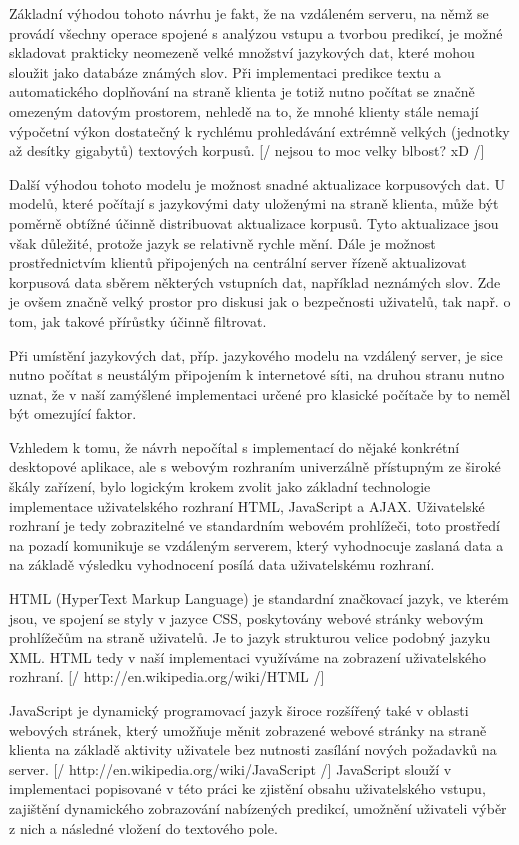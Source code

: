 \documentclass{article}
\begin{document}
Základní výhodou tohoto návrhu je fakt, že na vzdáleném serveru, na němž se provádí všechny operace spojené s analýzou vstupu a tvorbou predikcí, je možné skladovat prakticky neomezeně velké množství jazykových dat, které mohou sloužit jako databáze známých slov. Při implementaci predikce textu a automatického doplňování na straně klienta je totiž nutno počítat se značně omezeným datovým prostorem, nehledě na to, že mnohé klienty stále nemají výpočetní výkon dostatečný k rychlému prohledávání extrémně velkých (jednotky až desítky gigabytů) textových korpusů. [/ nejsou to moc velky blbost? xD /]

Další výhodou tohoto modelu je možnost snadné aktualizace korpusových dat. U modelů, které počítají s jazykovými daty uloženými na straně klienta, může být poměrně obtížné účinně distribuovat aktualizace korpusů. Tyto aktualizace jsou však důležité, protože jazyk se relativně rychle mění. Dále je možnost prostřednictvím klientů připojených na centrální server řízeně aktualizovat korpusová data sběrem některých vstupních dat, například neznámých slov. Zde je ovšem značně velký prostor pro diskusi jak o bezpečnosti uživatelů, tak např. o tom, jak takové přírůstky účinně filtrovat.

Při umístění jazykových dat, příp. jazykového modelu na vzdálený server, je sice nutno počítat s neustálým připojením k internetové síti, na druhou stranu nutno uznat, že v naší zamýšlené implementaci určené pro klasické počítače by to neměl být omezující faktor. 

Vzhledem k tomu, že návrh nepočítal s implementací do nějaké konkrétní desktopové aplikace, ale s webovým rozhraním univerzálně přístupným ze široké škály zařízení, bylo logickým krokem zvolit jako základní technologie implementace uživatelského rozhraní HTML, JavaScript a AJAX. Uživatelské rozhraní je tedy zobrazitelné ve standardním webovém prohlížeči, toto prostředí na pozadí komunikuje se vzdáleným serverem, který vyhodnocuje zaslaná data a na základě výsledku vyhodnocení posílá data uživatelskému rozhraní.

HTML (HyperText Markup Language) je standardní značkovací jazyk, ve kterém jsou, ve spojení se styly v jazyce CSS, poskytovány webové stránky webovým prohlížečům na straně uživatelů. Je to jazyk strukturou velice podobný jazyku XML. HTML tedy v naší implementaci využíváme na zobrazení uživatelského rozhraní. [/ http://en.wikipedia.org/wiki/HTML /]

JavaScript je dynamický programovací jazyk široce rozšířený také v oblasti webových stránek, který umožňuje měnit zobrazené webové stránky na straně klienta na základě aktivity uživatele bez nutnosti zasílání nových požadavků na server. [/ http://en.wikipedia.org/wiki/JavaScript /] JavaScript slouží v implementaci popisované v této práci ke zjistění obsahu uživatelského vstupu, zajištění dynamického zobrazování nabízených predikcí, umožnění uživateli výběr z nich a následné vložení do textového pole.
\end{document}

